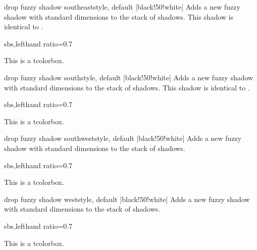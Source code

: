 \begin{docTcbKey}{drop fuzzy shadow southeast}{}{style, default |black!50!white|}
  Adds a new fuzzy shadow with standard dimensions to the stack of shadows.
  This shadow is identical to .
\begin{dispExample*}{sbs,lefthand ratio=0.7}
\begin{tcolorbox}[drop fuzzy shadow southeast,
  enhanced,colback=red!5!white,colframe=red!75!black]
  This is a tcolorbox.
\end{tcolorbox}
\end{dispExample*}
\end{docTcbKey}%

\begin{docTcbKey}{drop fuzzy shadow south}{}{style, default |black!50!white|}
  Adds a new fuzzy shadow with standard dimensions to the stack of shadows.
  This shadow is identical to .
\begin{dispExample*}{sbs,lefthand ratio=0.7}
\begin{tcolorbox}[drop fuzzy shadow south,
  enhanced,colback=red!5!white,colframe=red!75!black]
  This is a tcolorbox.
\end{tcolorbox}
\end{dispExample*}
\end{docTcbKey}%

\begin{docTcbKey}{drop fuzzy shadow southwest}{}{style, default |black!50!white|}
  Adds a new fuzzy shadow with standard dimensions to the stack of shadows.
\begin{dispExample*}{sbs,lefthand ratio=0.7}
\begin{tcolorbox}[drop fuzzy shadow southwest,
  enhanced,colback=red!5!white,colframe=red!75!black]
  This is a tcolorbox.
\end{tcolorbox}
\end{dispExample*}
\end{docTcbKey}%

\begin{docTcbKey}{drop fuzzy shadow west}{}{style, default |black!50!white|}
  Adds a new fuzzy shadow with standard dimensions to the stack of shadows.
\begin{dispExample*}{sbs,lefthand ratio=0.7}
\begin{tcolorbox}[drop fuzzy shadow west,
  enhanced,colback=red!5!white,colframe=red!75!black]
  This is a tcolorbox.
\end{tcolorbox}
\end{dispExample*}
\end{docTcbKey}%

